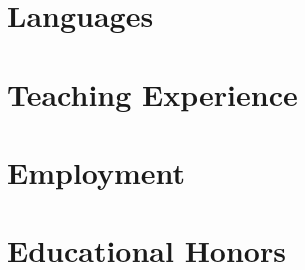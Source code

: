 \section*{Languages}


\section*{Teaching Experience}


\section*{Employment}


\section*{Educational Honors}


\thispagestyle{lastpagestyle}



